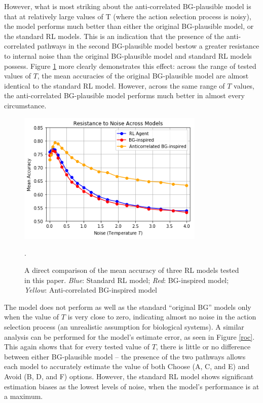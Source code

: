 \documentclass[10pt,letterpaper]{article}
\begin{document}
However, what is most striking about the anti-correlated BG-plausible model is that at relatively large values of T (where the action selection process is noisy), the model performs much better than either the original BG-plausible model, or the standard RL models. This is an indication that the presence of the anti-correlated pathways in the second BG-plausible model bestow a greater resistance to internal noise than the original BG-plausible model and standard RL models possess. Figure \ref{resistance-to-noise} more clearly demonstrates this effect: across the range of tested values of $T$, the mean accuracies of the original BG-plausible model are almost identical to the standard RL model. However, across the same range of $T$ values, the anti-correlated BG-plausible model performs much better in almost every circumstance.

\begin{figure}[ht]
	\begin{center}
		\includegraphics[width=3.5in]{resistance-to-noise.png}
	\end{center}
	\caption{A direct comparison of the mean accuracy of three RL models tested in this paper. \emph{Blue}: Standard RL model; \emph{Red}: BG-inspired model; \emph{Yellow}: Anti-correlated BG-inspired model}. 
	\label{resistance-to-noise}
\end{figure}

The model does not perform as well as the standard ``original BG'' models only when the value of $T$ is very close to zero, indicating almost no noise in the action selection process (an unrealistic assumption for biological systems). A similar analysis can be performed for the model's estimate error, as seen in Figure \ref{roc}. This again shows that for every tested value of $T$, there is little or no difference between either BG-plausible model -- the presence of the two pathways allows each model to accurately estimate the value of both Choose (A, C, and E) and Avoid (B, D, and F) options. However, the standard RL model shows significant estimation biases as the lowest levels of noise, when the model's performance is at a maximum.
\end{document}
